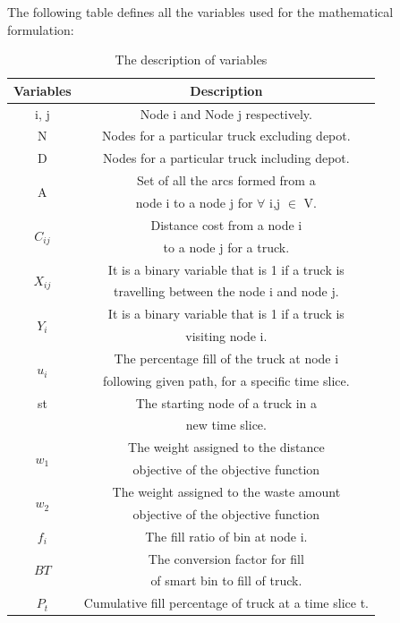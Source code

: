 \documentclass[12pt]{article}
\begin{document}
The following table defines all the variables used for the mathematical formulation:
\begin{table}[H]\label{variables}
	\centering
	\caption{The description of variables}
	\begin{tabular*}{486pt}[H]{|c|c|}
		\hline \hspace{40pt} Variables \hspace{40pt} & \hspace{130pt} Description \hspace{130pt} \\
		\hline i, j & Node i and Node j respectively.\\
		\hline N & Nodes for a particular truck excluding depot.\\
		\hline D & Nodes for a particular truck including depot.\\
		\hline \multirow{2}{*}{A} & Set of all the arcs formed from a\\
		&  node i to a node j for $\forall$ i,j $\in$ V.\\
		\hline \multirow{2}{*}{$C_{ij}$} & Distance cost from a node i\\
		& to a node j for a truck.\\
		\hline \multirow{2}{*}{$X_{ij}$} & It is a binary variable that is 1 if a truck is\\
		& travelling between the node i and node j.\\  
		\hline \multirow{2}{*}{$Y_{i}$} & It is a binary variable that is 1 if a truck is \\
		& visiting node i.\\
		\hline \multirow{2}{*}{$u_{i}$} & The percentage fill of the truck at node i \\
		& following given path, for a specific time slice.\\
		\hline \multirow{1}{*}{st} & The starting node of a truck in a\\
		& new time slice.\\
		\hline \multirow{2}{*}{$w_{1}$} & The weight assigned to the distance \\
		& objective of the objective function\\
		\hline \multirow{2}{*}{$w_{2}$} & The weight assigned to the waste amount \\
		& objective of the objective function\\
		\hline \multirow{1}{*}{$f_{i}$} & The fill ratio of bin at node i.\\
		\hline \multirow{2}{*}{$BT$} & The conversion factor for fill \\
		& of smart bin to fill of truck.\\
		\hline \multirow{1}{*}{$P_{t}$} & Cumulative fill percentage of truck at a time slice t.\\
		\hline
	\end{tabular*}
\end{table} 
\end{document}
